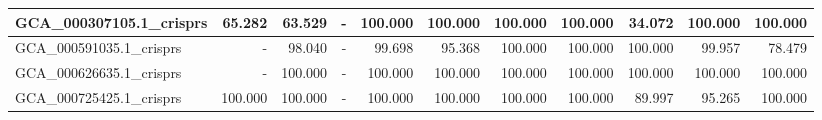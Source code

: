 \documentclass[12pt,a4paper]{article}
\begin{document}
\begin{table}[ht]
\begin{center}
\begin{tabular}{|l*{10}{|r}|}
GCA\_000307105.1\_crisprs & 65.282 & 63.529 & - & 100.000 & 100.000 & 100.000 & 100.000 & 34.072 & 100.000 & 100.000 \\ \hline
GCA\_000591035.1\_crisprs & - & 98.040 & - & 99.698 & 95.368 & 100.000 & 100.000 & 100.000 & 99.957 & 78.479 \\ \hline
GCA\_000626635.1\_crisprs & - & 100.000 & - & 100.000 & 100.000 & 100.000 & 100.000 & 100.000 & 100.000 & 100.000 \\ \hline
GCA\_000725425.1\_crisprs & 100.000 & 100.000 & - & 100.000 & 100.000 & 100.000 & 100.000 & 89.997 & 95.265 & 100.000 \\ \hline
\end{tabular}
\end{center}
\end{table}
\end{document}
